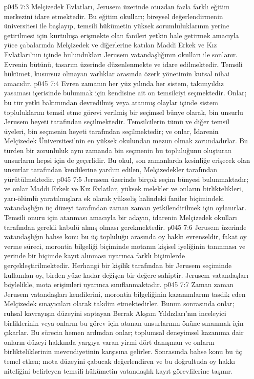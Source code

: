 \vs p045 7:3 Melçizedek Evlatları, Jerusem üzerinde otuzdan fazla farklı eğitim merkezini idare etmektedir. Bu eğitim okulları; bireysel değerlendirmenin üniversitesi ile başlayıp, temsili hükümetin yüksek sorumluluklarının yerine getirilmesi için kurtuluşa erişmekte olan fanileri yetkin hale getirmek amacıyla yüce çabalarında Melçizedek ve diğerlerine katılan Maddi Erkek ve Kız Evlatları’nın içinde bulundukları Jerusem vatandaşlığının okulları ile sonlanır. Evrenin bütünü,  tasarım üzerinde düzenlenmekte ve idare edilmektedir. Temsili hükümet, kusursuz olmayan varlıklar arasında özerk yönetimin kutsal nihai amacıdır.
\vs p045 7:4 Evren zamanın her yüz yılında her sistem, takımyıldız yasaması içerisinde bulunmak için kendisine ait on temsilciyi seçmektedir. Onlar; bu tür yetki bakımından devredilmiş veya atanmış olaylar içinde sistem topluluklarını temsil etme görevi verilmiş bir seçimsel bünye olarak, bin unsurlu Jerusem heyeti tarafından seçilmektedir. Temsilcilerin tümü ve diğer temsil üyeleri, bin seçmenin heyeti tarafından seçilmektedir; ve onlar, İdarenin Melçizedek Üniversitesi’nin en yüksek okulundan mezun olmak zorundadırlar. Bu türden bir zorunluluk aynı zamanda bin seçmenin bu topluluğunu oluşturan unsurların hepsi için de geçerlidir. Bu okul, son zamanlarda kesinliğe erişecek olan unsurlar tarafından kendilerine yardım edilen, Melçizedekler tarafından yürütülmektedir.
\vs p045 7:5 Jerusem üzerinde birçok seçim bünyesi bulunmaktadır; ve onlar Maddi Erkek ve Kız Evlatlar, yüksek melekler ve onların birliktelikleri, yarı\hyp{}ölümlü yaratılmışlara ek olarak yükseliş halindeki faniler biçimindeki vatandaşlığın üç düzeyi tarafından zaman zaman yetkilendirilmek için oylanırlar. Temsili onuru için atanması amacıyla bir adayın, idarenin Melçizedek okulları tarafından gerekli kabulü almış olması gerekmektedir.
\vs p045 7:6 Jerusem üzerinde vatandaşlığın bahse konu bu üç topluluğu arasında oy hakkı evrenseldir, fakat oy verme süreci, morontia bilgeliği biçiminde motanın kişisel iyeliğinin tanınması ve yerinde bir biçimde kayıt alınması uyarınca farklı biçimlerde gerçekleştirilmektedir. Herhangi bir kişilik tarafından bir Jerusem seçiminde kullanılan oy, birden yüze kadar değişen bir değere sahiptir. Jerusem vatandaşları böylelikle, mota erişimleri uyarınca sınıflanmaktadır.
\vs p045 7:7 Zaman zaman Jerusem vatandaşları kendilerini, morontia bilgeliğinin kazanımlarını tasdik eden Melçizedek sınayıcıları olarak takdim etmektedirler. Bunun sonrasında onlar; ruhsal kavrayışın düzeyini saptayan Berrak Akşam Yıldızları’nın inceleyici birliklerinin veya onların bu görev için atanan unsurlarının önüne sınanmak için çıkarlar. Bu sürecin hemen ardından onlar; toplumsal deneyimsel kazanıma dair onların düzeyi hakkında yargıya varan yirmi dört danışman ve onların birlikteliklerinin mevcudiyetinin karşısına gelirler. Sonrasında bahse konu bu üç temel etken; mota düzeyini çabucak değerlendiren ve bu doğrultuda oy hakkı niteliğini belirleyen temsili hükümetin vatandaşlık kayıt görevlilerine taşınır.
